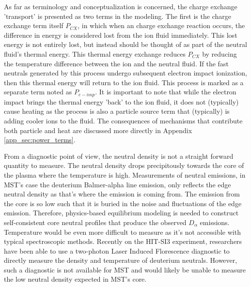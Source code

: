 \begin{refsection}
As far as terminology and conceptualization is concerned, the charge exchange 'transport' is presented as two terms in the modeling. The first is the charge exchange term itself $P_{CX}$, in which when an charge exchange reaction occurs, the difference in energy is considered lost from the ion fluid immediately. This lost energy is not entirely lost, but instead should be thought of as part of the neutral fluid's thermal energy. This thermal energy exchange reduces $P_{CX}$ by reducing the temperature difference between the ion and the neutral fluid. If the fast neutrals generated by this process undergo subsequent electron impact ionization, then this thermal energy will return to the ion fluid. This process is marked as a separate term noted as $P_{e-imp}$. It is important to note that while the electron impact brings the thermal energy 'back' to the ion fluid, it does not (typically) cause heating as the process is also a particle source term that (typically) is adding cooler ions to the fluid. The consequences of mechanisms that contribute both particle and heat are discussed more directly in Appendix \ref{app_sec:power_terms}.

From a diagnostic point of view, the neutral density is not a straight forward quantity to measure. The neutral density drops precipitously towards the core of the plasma where the temperature is high. Measurements of neutral emissions, in MST's case the deuterium Balmer-alpha line emission, only reflects the edge neutral density as that's where the emission is coming from. The emission from the core is so low such that it is buried in the noise and fluctuations of the edge emission. Therefore, physics-based equilibrium modeling is needed to construct self-consistent core neutral profiles that produce the observed $D_{\alpha}$ emissions. Temperature would be even more difficult to measure as it's not accessible with typical spectroscopic methods. Recently on the HIT-SI3 experiment, researchers have been able to use a two-photon Laser Induced Florescence diagnostic to directly measure the density and temperature of deuterium neutrals\cite{Elliott2016}. However, such a diagnostic is not available for MST and would likely be unable to measure the low neutral density expected in MST's core. 


\end{refsection}
